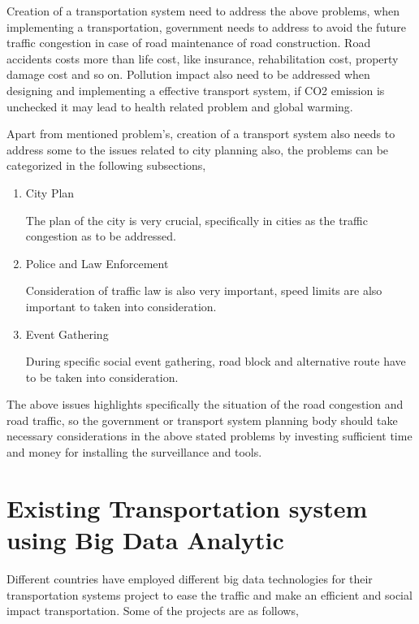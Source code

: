 \documentclass[sigconf]{acmart}
\begin{document}
Creation of a transportation system need to address the above problems, when implementing a transportation, government needs to address to avoid the future traffic congestion in case of road maintenance of road construction. Road accidents costs more than life cost, like insurance, rehabilitation cost, property damage cost and so on. Pollution impact also need to be addressed when designing and implementing a effective transport system, if CO2 emission is unchecked it may lead to health related problem and global warming.

Apart from mentioned problem's, creation of a transport system also needs to address some to the issues related to city planning also, the problems can be categorized in the following subsections,

\begin{enumerate}
\item City Plan 

The plan of the city is very crucial, specifically in cities as the traffic congestion as to be addressed. 

\item Police and Law Enforcement 

Consideration of traffic law is also very important, speed limits are also important to taken into consideration.

\item Event Gathering 

During specific social event gathering, road block and alternative route have to be taken into consideration.

\end{enumerate}

The above issues highlights specifically the situation of the road congestion and road traffic, so the government or transport system planning body should take necessary considerations in the above stated problems by investing sufficient time and money for installing the surveillance and tools. 


\section{Existing Transportation system using Big Data Analytic}

Different countries have employed different big data technologies for their transportation systems project to ease the traffic and make an efficient and social impact transportation. Some of the projects are as follows,
\end{document}
